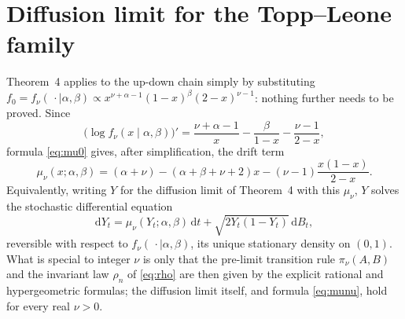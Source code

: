 \documentclass[11pt,reqno]{amsart}
\theoremstyle{definition}
\theoremstyle{remark}
\numberwithin{equation}{section}
\begin{document}
\section{Diffusion limit for the Topp--Leone family}

Theorem~4 applies to the up-down chain simply by substituting \(f_0=f_\nu(\,\cdot\mid\alpha,\beta)\propto x^{\nu+\alpha-1}(1-x)^\beta(2-x)^{\nu-1}\): nothing further needs to be proved. Since
\[
\bigl(\log f_\nu(x\mid\alpha,\beta)\bigr)'=\frac{\nu+\alpha-1}{x}-\frac{\beta}{1-x}-\frac{\nu-1}{2-x},
\]
formula \eqref{eq:mu0} gives, after simplification, the drift term
\begin{equation}\label{eq:munu}
\mu_\nu(x;\alpha,\beta)=(\alpha+\nu)-(\alpha+\beta+\nu+2)x-(\nu-1)\frac{x(1-x)}{2-x}.
\end{equation}
Equivalently, writing \(Y\) for the diffusion limit of Theorem~4 with this \(\mu_\nu\), \(Y\) solves the stochastic differential equation
\begin{equation}\label{eq:SDEnu}
\mathrm{d}Y_t=\mu_\nu(Y_t;\alpha,\beta)\,\mathrm{d}t+\sqrt{2Y_t(1-Y_t)}\,\mathrm{d}B_t,
\end{equation}
reversible with respect to \(f_\nu(\,\cdot\mid\alpha,\beta)\), its unique stationary density on \((0,1)\). What is special to integer \(\nu\) is only that the pre-limit transition rule \(\pi_\nu(A,B)\) and the invariant law \(\rho_n\) of \eqref{eq:rho} are then given by the explicit rational and hypergeometric formulas; the diffusion limit itself, and formula \eqref{eq:munu}, hold for every real \(\nu>0\).
\end{document}
